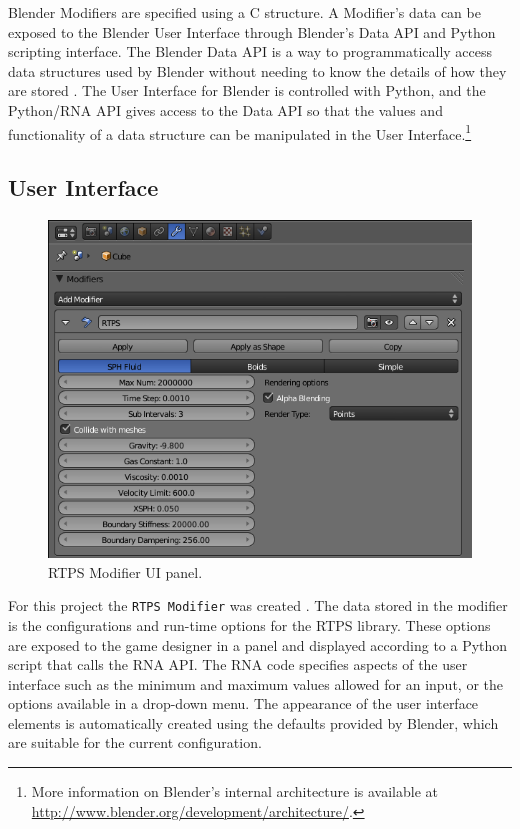 Blender Modifiers are specified using a C structure. A Modifier's data can be
exposed to the Blender User Interface through Blender's Data API and Python
scripting interface. The Blender Data API is a way to programmatically access
data structures used by Blender without needing to know the details of how they
are stored \cite{b3dDataAPI}. The User Interface for Blender is controlled with
Python, and the Python/RNA API gives access to the Data API so that the values
and functionality of a data structure can be manipulated in the User
Interface.\footnote{More information on Blender's internal architecture is
available at \url{http://www.blender.org/development/architecture/}.}


\subsection{User Interface}
\begin{figure}[!htc]
 		\centering
		\includegraphics[scale=0.6]{figures/ui_mod.png}
        \caption{ RTPS Modifier UI panel. }
		\label{fig:ui_mod}
\end{figure}


For this project the \verb|RTPS Modifier| was created \cite{enjaCustomModifier}. The
data stored in the modifier is the configurations and run-time options for the
RTPS library.  These options are exposed to the game designer in a panel and
displayed according to a Python script that calls the RNA API. The RNA code
specifies aspects of the user interface such as the minimum and maximum values
allowed for an input, or the options available in a drop-down menu. The
appearance of the user interface elements is automatically created using the
defaults provided by Blender, which are suitable for the current configuration.



